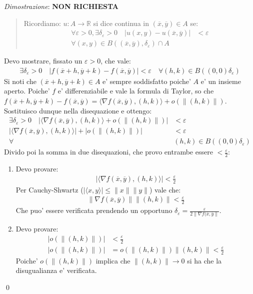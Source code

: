 \documentclass{article}
\begin{document}
\noindent \emph{Dimostrazione}: \textbf{NON RICHIESTA} \\
\begin{quote}
  Ricordiamo: $u: A \to \mathbb{R}$ si dice continua in $(\overline{x}, \overline{y}) \in A$ se: 
  \begin{align*}
    \forall \varepsilon > 0, \exists \delta_{\varepsilon} > 0 \quad | u(x, y)
    - u(\overline{x}, \overline{y}) | &< \varepsilon \\
    \forall (x,y) \in B((\overline{x}, \overline{y}), \delta_{\varepsilon}) \cap A
  \end{align*}
\end{quote}
Devo mostrare, fissato un $\varepsilon > 0$, che vale:
\begin{align*}
  \exists \delta_{\varepsilon} > 0 \quad | f(\overline{x} + h, \overline{y} + k)
  - f(\overline{x}, \overline{y}) | < \varepsilon \quad
  \forall (h,k) \in B((0,0) \delta_{\varepsilon})
\end{align*}
Si noti che $(\overline{x} + h, \overline{y} + k) \in A$ e' sempre soddisfatto
poiche' $A$ e' un insieme aperto. Poiche' $f$ e' differenziabile e vale la formula
di Taylor, so che $f(\overline{x} + h, \overline{y} + k) - f(\overline{x}, \overline{y}) =
\langle \nabla f(\overline{x}, \overline{y}), (h,k) \rangle + o(\|(h,k)\|)$. Sostituisco
dunque nella disequazione e ottengo:
\begin{align*}
  \exists \delta_{\varepsilon} > 0 \quad |\langle \nabla f(\overline{x},
  \overline{y}), (h,k) \rangle + o(\|(h,k)\|)| &< \varepsilon \\
  |\langle \nabla f(\overline{x}, \overline{y}), (h,k) \rangle| + |o(\|(h,k)\|)|
  &< \varepsilon \\
  \forall &(h,k) \in B((0,0) \delta_{\varepsilon})
\end{align*}
Divido poi la somma in due disequazioni, che provo entrambe essere $< \frac{
\varepsilon}{2}$:
\begin{enumerate}
  \item Devo provare:
    \begin{align*}
      |\langle \nabla f(\overline{x}, \overline{y}), (h,k) \rangle| < \frac{\varepsilon}{2}
    \end{align*}
    Per Cauchy-Shwartz ($|\langle x,y \rangle| \leq \|x\| \|y\|$) vale che:
    \begin{align*}
      \|\nabla f(\overline{x}, \overline{y})\| \|(h,k)\| < \frac{\varepsilon}{2}
    \end{align*}
    Che puo' essere verificata prendendo un opportuno $\delta_{\varepsilon} =
    \frac{\varepsilon}{2\|\nabla f(\overline{x}, \overline{y}\|}$.

  \item Devo provare:
    \begin{align*}
      |o(\|(h,k)\|)| &< \frac{\varepsilon}{2} \\
      |o(\|(h,k)\|)| &= o(\|(h,k)\|) \|(h,k)\| < \frac{\varepsilon}{2}
    \end{align*}
    Poiche' $o(\|(h,k)\|)$ implica che $\|(h,k)\| \to 0$ si ha che la
    disugualianza e' verificata.
\end{enumerate}
\qed
\end{document}
